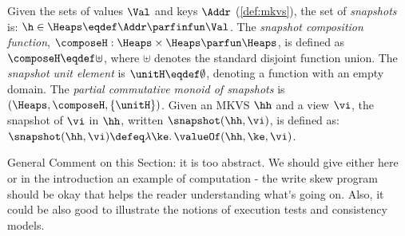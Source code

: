 \begin{definition}[Snapshots]
\label{def:heaps}
\label{def:snapshot}
Given the sets of values $\Val$  and keys \( \Addr\)  (\cref{def:mkvs}), the set of \emph{snapshots} is:
$
    \h \in \Heaps \eqdef \Addr \parfinfun \Val
$. 
The \emph{snapshot composition function}, $\composeH: \Heaps \times \Heaps \parfun \Heaps$, is defined as $\composeH \eqdef \uplus$, where $\uplus$ denotes the standard disjoint function union. The \emph{ snapshot unit element} is $\unitH \eqdef \emptyset$, denoting a function with an empty domain.
The \emph{partial commutative monoid of snapshots} is $(\Heaps, \composeH, \{\unitH\})$.
Given an MKVS $\hh$ and a view $\vi$, the snapshot of $\vi$ in $\hh$, written $\snapshot(\hh, \vi) $, is defined as:
$
    \snapshot(\hh, \vi) \defeq \lambda \ke \ldotp \valueOf(\hh, \ke, \vi)
$.
\end{definition}

\ac{General Comment on this Section: it is too abstract. We 
should give either here or in the introduction an example of computation - 
the write skew program should be okay that helps the reader understanding 
what's going on. Also, it could be also good to illustrate the notions 
of execution tests and consistency models.}








